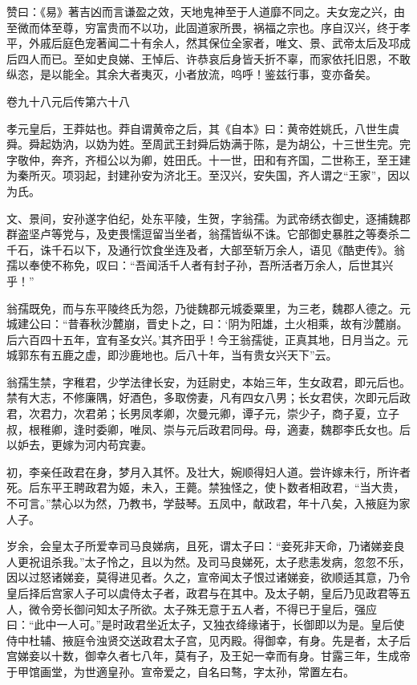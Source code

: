 \documentclass[12pt,UTF8]{ctexbook}
\begin{document}
赞曰：《易》著吉凶而言谦盈之效，天地鬼神至于人道靡不同之。夫女宠之兴，由至微而体至尊，穷富贵而不以功，此固道家所畏，祸福之宗也。序自汉兴，终于孝平，外戚后庭色宠著闻二十有余人，然其保位全家者，唯文、景、武帝太后及邛成后四人而已。至如史良娣、王悼后、许恭哀后身皆夭折不辜，而家依托旧恩，不敢纵恣，是以能全。其余大者夷灭，小者放流，呜呼！鉴兹行事，变亦备矣。





卷九十八元后传第六十八



孝元皇后，王莽姑也。莽自谓黄帝之后，其《自本》曰：黄帝姓姚氏，八世生虞舜。舜起妫汭，以妫为姓。至周武王封舜后妫满于陈，是为胡公，十三世生完。完字敬仲，奔齐，齐桓公以为卿，姓田氏。十一世，田和有齐国，二世称王，至王建为秦所灭。项羽起，封建孙安为济北王。至汉兴，安失国，齐人谓之“王家”，因以为氏。



文、景间，安孙遂字伯纪，处东平陵，生贺，字翁孺。为武帝绣衣御史，逐捕魏郡群盗坚卢等党与，及吏畏懦逗留当坐者，翁孺皆纵不诛。它部御史暴胜之等奏杀二千石，诛千石以下，及通行饮食坐连及者，大部至斩万余人，语见《酷吏传》。翁孺以奉使不称免，叹曰：“吾闻活千人者有封子孙，吾所活者万余人，后世其兴乎！”



翁孺既免，而与东平陵终氏为怨，乃徙魏郡元城委粟里，为三老，魏郡人德之。元城建公曰：“昔春秋沙麓崩，晋史卜之，曰：‘阴为阳雄，土火相乘，故有沙麓崩。后六百四十五年，宜有圣女兴。’其齐田乎！今王翁孺徙，正真其地，日月当之。元城郭东有五鹿之虚，即沙鹿地也。后八十年，当有贵女兴天下”云。



翁孺生禁，字稚君，少学法律长安，为廷尉史，本始三年，生女政君，即元后也。禁有大志，不修廉隅，好酒色，多取傍妻，凡有四女八男；长女君侠，次即元后政君，次君力，次君弟；长男凤孝卿，次曼元卿，谭子元，崇少子，商子夏，立子叔，根稚卿，逢时委卿，唯凤、崇与元后政君同母。母，適妻，魏郡李氏女也。后以妒去，更嫁为河内苟宾妻。



初，李亲任政君在身，梦月入其怀。及壮大，婉顺得妇人道。尝许嫁未行，所许者死。后东平王聘政君为姬，未入，王薨。禁独怪之，使卜数者相政君，“当大贵，不可言。”禁心以为然，乃教书，学鼓琴。五凤中，献政君，年十八矣，入掖庭为家人子。



岁余，会皇太子所爱幸司马良娣病，且死，谓太子曰：“妾死非天命，乃诸娣妾良人更祝诅杀我。”太子怜之，且以为然。及司马良娣死，太子悲恚发病，忽忽不乐，因以过怒诸娣妾，莫得进见者。久之，宣帝闻太子恨过诸娣妾，欲顺适其意，乃令皇后择后宫家人子可以虞侍太子者，政君与在其中。及太子朝，皇后乃见政君等五人，微令旁长御问知太子所欲。太子殊无意于五人者，不得已于皇后，强应曰：“此中一人可。”是时政君坐近太子，又独衣绛缘诸于，长御即以为是。皇后使侍中杜辅、掖庭令浊贤交送政君太子宫，见丙殿。得御幸，有身。先是者，太子后宫娣妾以十数，御幸久者七八年，莫有子，及王妃一幸而有身。甘露三年，生成帝于甲馆画堂，为世適皇孙。宣帝爱之，自名曰骜，字太孙，常置左右。
\end{document}
